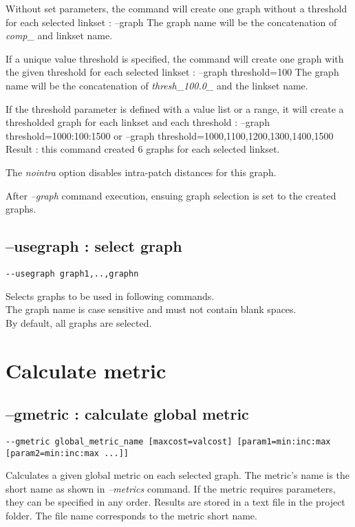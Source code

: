 \documentclass[a4paper,10pt]{report}
\newenvironment{cmd}
{\quote\Verbatim}
{\endVerbatim\endquote}
\begin{document}
Without set parameters, the command will create one graph without a threshold for each selected linkset :
\begin{cmd}
--graph
\end{cmd}
The graph name will be the concatenation of \textit{comp\_} and linkset name.

If a unique value threshold is specified, the command will create one graph with the given threshold for each selected linkset :
\begin{cmd}
--graph threshold=100
\end{cmd}
The graph name will be the concatenation of \textit{thresh\_100.0\_} and the linkset name.

If the threshold parameter is defined with a value list or a range, it will create a thresholded graph for each linkset and each threshold :
\begin{cmd}
--graph threshold=1000:100:1500
or
--graph threshold=1000,1100,1200,1300,1400,1500
\end{cmd}
Result : this command created 6 graphs for each selected linkset.

The \textit{nointra} option disables intra-patch distances for this graph.

After \textit{--graph} command execution, ensuing graph selection is set to the created graphs.

\subsection{--usegraph : select graph}
\begin{verbatim}
--usegraph graph1,..,graphn
\end{verbatim}
Selects graphs to be used in following commands.\\
The graph name is case sensitive and must not contain blank spaces.\\
By default, all graphs are selected.


\section{Calculate metric}

\subsection{--gmetric : calculate global metric}
\begin{verbatim}
--gmetric global_metric_name [maxcost=valcost] [param1=min:inc:max [param2=min:inc:max ...]]
\end{verbatim}
Calculates a given global metric on each selected graph. 
The metric's name is the short name as shown in \textit{--metrics} command.
If the metric requires parameters, they can be specified in any order.
Results are stored in a text file in the project folder. The file name corresponds to the metric short name.
\end{document}
